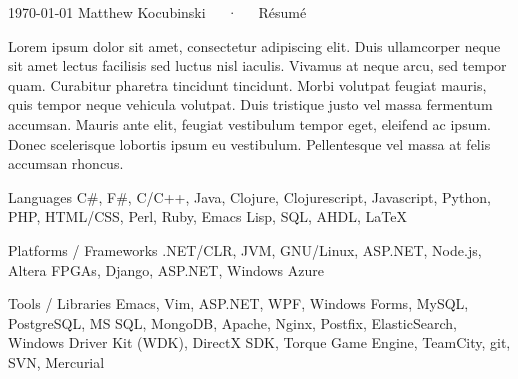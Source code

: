 \documentclass[11pt, letterpaper]{awesome-cv}
\begin{document}
\makecvheader

\makecvfooter
  {\today}
  {Matthew Kocubinski~~~·~~~Résumé}
  {\thepage}



\begin{cvparagraph}

Lorem ipsum dolor sit amet, consectetur adipiscing elit. Duis ullamcorper neque sit amet lectus facilisis sed luctus nisl iaculis. Vivamus at neque arcu, sed tempor quam. Curabitur pharetra tincidunt tincidunt. Morbi volutpat feugiat mauris, quis tempor neque vehicula volutpat. Duis tristique justo vel massa fermentum accumsan. Mauris ante elit, feugiat vestibulum tempor eget, eleifend ac ipsum. Donec scelerisque lobortis ipsum eu vestibulum. Pellentesque vel massa at felis accumsan rhoncus.
\end{cvparagraph}




\begin{cvskills}

  \cvskill
    {Languages} %
    {C\#, F\#, C/C++, Java, Clojure, Clojurescript, Javascript, Python, PHP, HTML/CSS, Perl, Ruby, Emacs Lisp, SQL, AHDL, LaTeX} %

  \cvskill
    {Platforms / Frameworks} %
    {.NET/CLR, JVM, GNU/Linux, ASP.NET, Node.js, Altera FPGAs, Django, ASP.NET, Windows Azure } %

  \cvskill
    {Tools / Libraries} %
    {Emacs, Vim, ASP.NET, WPF, Windows Forms, MySQL, PostgreSQL, MS SQL, MongoDB, Apache, Nginx, Postfix, ElasticSearch, Windows Driver Kit (WDK), DirectX SDK, Torque Game Engine, TeamCity, git, SVN, Mercurial}

\end{cvskills}
\end{document}
